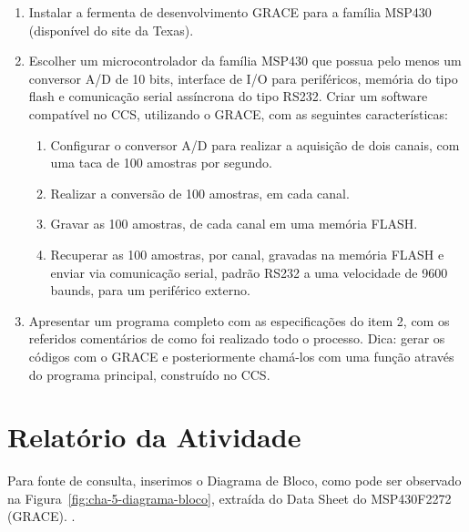 \documentclass[
	12pt,				%
	openright,			%
  oneside,     %
	a4paper,			%
	english,			%
	french,				%
	spanish,			%
	brazil				%
	]{abntex2}
\begin{document}
\begin{enumerate}
  \item Instalar a fermenta de desenvolvimento GRACE para a família MSP430 (disponível do site da Texas).
  \item Escolher um microcontrolador da família MSP430 que possua pelo menos um conversor A/D de 10 bits, interface de I/O para periféricos, memória do tipo flash e comunicação serial assíncrona do tipo RS232. Criar um software compatível no CCS, utilizando o GRACE, com as seguintes características:
  \begin{enumerate}
    \item Configurar o conversor A/D para realizar a aquisição de dois canais, com uma taca de 100 amostras por segundo.
    \item Realizar a conversão de 100 amostras, em cada canal.
    \item Gravar as 100 amostras, de cada canal em uma memória FLASH.
    \item Recuperar as 100 amostras, por canal, gravadas na memória FLASH e enviar via comunicação serial, padrão RS232 a uma velocidade de 9600 baunds, para um periférico externo.
  \end{enumerate}
  \item Apresentar um programa completo com as especificações do item 2, com os referidos comentários de como foi realizado todo o processo. Dica: gerar os códigos com o GRACE e posteriormente chamá-los com uma função através do programa principal, construído no CCS.
\end{enumerate}


\section{Relatório da Atividade} %
\label{sec:msp430_grace-consideracoes}

Para fonte de consulta, inserimos o Diagrama de Bloco, como pode ser observado na Figura~\ref{fig:cha-5-diagrama-bloco}, extraída do Data Sheet do MSP430F2272 (GRACE). \cite{Instruments2012}.
\end{document}
